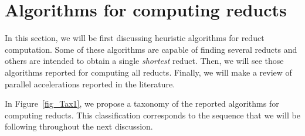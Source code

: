 \documentclass[citenumber]{llncs}
\begin{document}
\section{Algorithms for computing reducts}\label{relatedWork}
  In this section, we will be first discussing heuristic algorithms for reduct computation. Some of these 
  algorithms are capable of finding several reducts and others are intended to obtain a single \textit{shortest} 
  reduct. Then, we will see those algorithms reported for computing all reducts. Finally, we will make a review of parallel accelerations reported in 
  the literature.  
  
  In Figure~\ref{fig_Tax1}, we propose a taxonomy of the reported algorithms for computing reducts.
  This classification corresponds to the sequence that we will be following throughout the next discussion.
   
\end{document}
